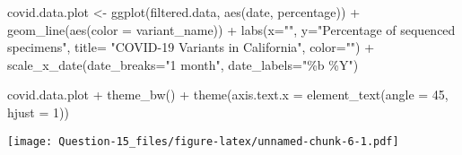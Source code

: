 \documentclass[
]{article}
\newenvironment{Shaded}{\begin{snugshade}}{\end{snugshade}}
\newcommand{\AttributeTok}[1]{\textcolor[rgb]{0.77,0.63,0.00}{#1}}
\newcommand{\DecValTok}[1]{\textcolor[rgb]{0.00,0.00,0.81}{#1}}
\newcommand{\FunctionTok}[1]{\textcolor[rgb]{0.00,0.00,0.00}{#1}}
\newcommand{\NormalTok}[1]{#1}
\newcommand{\OtherTok}[1]{\textcolor[rgb]{0.56,0.35,0.01}{#1}}
\newcommand{\SpecialCharTok}[1]{\textcolor[rgb]{0.00,0.00,0.00}{#1}}
\newcommand{\StringTok}[1]{\textcolor[rgb]{0.31,0.60,0.02}{#1}}
\begin{document}
\begin{Shaded}
\begin{Highlighting}[]
\NormalTok{covid.data.plot }\OtherTok{\textless{}{-}} \FunctionTok{ggplot}\NormalTok{(filtered.data, }\FunctionTok{aes}\NormalTok{(date, percentage)) }\SpecialCharTok{+}
  \FunctionTok{geom\_line}\NormalTok{(}\FunctionTok{aes}\NormalTok{(}\AttributeTok{color =}\NormalTok{ variant\_name)) }\SpecialCharTok{+}
  \FunctionTok{labs}\NormalTok{(}\AttributeTok{x=}\StringTok{""}\NormalTok{, }\AttributeTok{y=}\StringTok{"Percentage of sequenced specimens"}\NormalTok{, }
       \AttributeTok{title=} \StringTok{"COVID{-}19 Variants in California"}\NormalTok{, }\AttributeTok{color=}\StringTok{""}\NormalTok{) }\SpecialCharTok{+} 
  \FunctionTok{scale\_x\_date}\NormalTok{(}\AttributeTok{date\_breaks=}\StringTok{"1 month"}\NormalTok{, }\AttributeTok{date\_labels=}\StringTok{"\%b \%Y"}\NormalTok{) }
  
\NormalTok{covid.data.plot }\SpecialCharTok{+} \FunctionTok{theme\_bw}\NormalTok{() }\SpecialCharTok{+} 
  \FunctionTok{theme}\NormalTok{(}\AttributeTok{axis.text.x =} \FunctionTok{element\_text}\NormalTok{(}\AttributeTok{angle =} \DecValTok{45}\NormalTok{, }\AttributeTok{hjust =} \DecValTok{1}\NormalTok{))}
\end{Highlighting}
\end{Shaded}

\texttt{[image: Question-15\_files/figure-latex/unnamed-chunk-6-1.pdf]}
\end{document}
